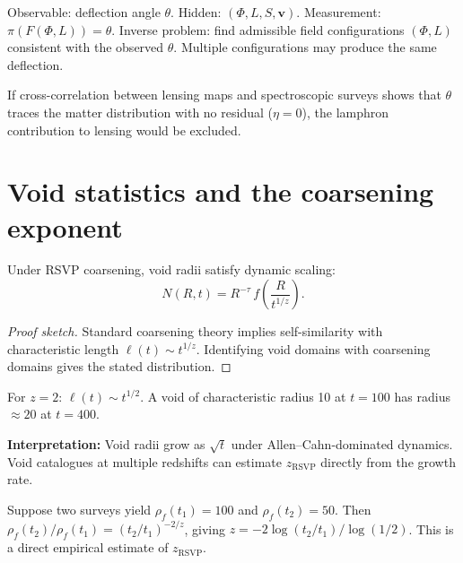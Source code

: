 \begin{ReconView}
  Observable: deflection angle $\theta$.
  Hidden: $(\Phi, L, S, \mathbf{v})$.
  Measurement: $\pi(F(\Phi, L)) = \theta$.
  Inverse problem: find admissible field configurations
  $(\Phi, L)$ consistent with the observed $\theta$.
  Multiple configurations may produce the same deflection.
\end{ReconView}

\begin{Falsifiability}
  If cross-correlation between lensing maps and spectroscopic
  surveys shows that $\theta$ traces the matter distribution
  with no residual ($\eta = 0$), the lamphron contribution
  to lensing would be excluded.
\end{Falsifiability}

\section{Void statistics and the coarsening exponent}

\begin{theorem}
  \label{thm:void-scaling}
  \statusconjectured{}
  Under RSVP coarsening, void radii satisfy dynamic scaling:
  \[
    N(R,t) = R^{-\tau}\,f\!\left(\frac{R}{t^{1/z}}\right).
  \]
\end{theorem}

\begin{proof}[Proof sketch]
  Standard coarsening theory implies self-similarity with
  characteristic length $\ell(t) \sim t^{1/z}$.
  Identifying void domains with coarsening domains gives the
  stated distribution.
\end{proof}

\begin{WorkedExample}[Void growth under $z=2$]
  For $z = 2$: $\ell(t) \sim t^{1/2}$.
  A void of characteristic radius 10 at $t = 100$ has
  radius $\approx 20$ at $t = 400$.

  \textbf{Interpretation:} Void radii grow as $\sqrt{t}$ under
  Allen--Cahn-dominated dynamics.
  Void catalogues at multiple redshifts can estimate
  $z_{\mathrm{RSVP}}$ directly from the growth rate.
\end{WorkedExample}

\begin{WorkedExample}
  Suppose two surveys yield $\rho_f(t_1) = 100$ and
  $\rho_f(t_2) = 50$.
  Then $\rho_f(t_2)/\rho_f(t_1) = (t_2/t_1)^{-2/z}$,
  giving $z = -2\log(t_2/t_1)/\log(1/2)$.
  This is a direct empirical estimate of $z_{\mathrm{RSVP}}$.
\end{WorkedExample}

